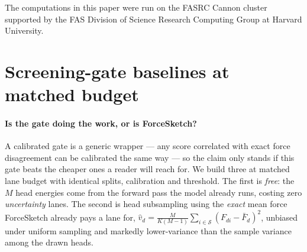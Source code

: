 \documentclass{article}
\begin{document}
%
\begin{ack}
The computations in this paper were run on the FASRC Cannon cluster supported by
the FAS Division of Science Research Computing Group at Harvard University.
\end{ack}




\appendix

\section{Screening-gate baselines at matched budget}
\label{app:gates}
\paragraph{Is the gate doing the work, or is ForceSketch?}
A calibrated gate is a generic wrapper --- any score correlated with exact force disagreement can be
calibrated the same way --- so the claim only stands if this gate beats the cheaper ones a reader
will reach for. We build three at matched lane budget with identical splits, calibration and
threshold. The first is \emph{free}: the $M$ head energies come from the forward pass the model
already runs, costing zero \emph{uncertainty} lanes. The second is head subsampling using the
\emph{exact} mean force ForceSketch already pays a lane for,
$\hat v_d=\frac{M}{K(M-1)}\sum_{i\in\mathcal S}(F_{di}-\bar F_d)^2$, unbiased under uniform sampling
and markedly lower-variance than the sample variance among the drawn heads.
\end{document}
